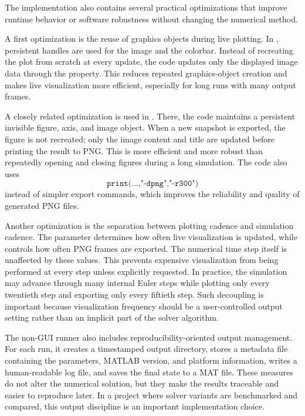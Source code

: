 The implementation also contains several practical optimizations that improve runtime behavior or software robustness without changing the numerical method.

A first optimization is the reuse of graphics objects during live plotting. In , persistent handles are used for the image and the colorbar. Instead of recreating the plot from scratch at every update, the code updates only the displayed image data through the  property. This reduces repeated graphics-object creation and makes live visualization more efficient, especially for long runs with many output frames.

A closely related optimization is used in . There, the code maintains a persistent invisible figure, axis, and image object. When a new snapshot is exported, the figure is not recreated; only the image content and title are updated before printing the result to PNG. This is more efficient and more robust than repeatedly opening and closing figures during a long simulation. The code also uses
\[
\texttt{print(...,"-dpng","-r300")}
\]
instead of simpler export commands, which improves the reliability and quality of generated PNG files.

Another optimization is the separation between plotting cadence and simulation cadence. The parameter  determines how often live visualization is updated, while  controls how often PNG frames are exported. The numerical time step itself is unaffected by these values. This prevents expensive visualization from being performed at every step unless explicitly requested. In practice, the simulation may advance through many internal Euler steps while plotting only every twentieth step and exporting only every fiftieth step. Such decoupling is important because visualization frequency should be a user-controlled output setting rather than an implicit part of the solver algorithm.

The non-GUI runner  also includes reproducibility-oriented output management. For each run, it creates a timestamped output directory, stores a metadata file containing the parameters, MATLAB version, and platform information, writes a human-readable log file, and saves the final state to a MAT file. These measures do not alter the numerical solution, but they make the results traceable and easier to reproduce later. In a project where solver variants are benchmarked and compared, this output discipline is an important implementation choice.

